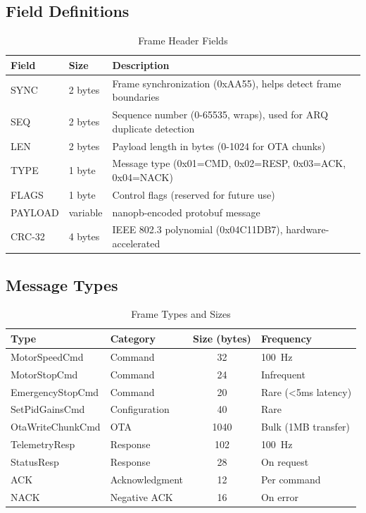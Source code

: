 \documentclass[12pt,letterpaper]{article}
\begin{document}
\subsection{Field Definitions}

\begin{table}[H]
\centering
\caption{Frame Header Fields}
\begin{tabular}{llp{7cm}}
\toprule
\textbf{Field} & \textbf{Size} & \textbf{Description} \\
\midrule
SYNC & 2 bytes & Frame synchronization (0xAA55), helps detect frame boundaries \\
SEQ & 2 bytes & Sequence number (0-65535, wraps), used for ARQ duplicate detection \\
LEN & 2 bytes & Payload length in bytes (0-1024 for OTA chunks) \\
TYPE & 1 byte & Message type (0x01=CMD, 0x02=RESP, 0x03=ACK, 0x04=NACK) \\
FLAGS & 1 byte & Control flags (reserved for future use) \\
PAYLOAD & variable & nanopb-encoded protobuf message \\
CRC-32 & 4 bytes & IEEE 802.3 polynomial (0x04C11DB7), hardware-accelerated \\
\bottomrule
\end{tabular}
\end{table}

\subsection{Message Types}

\begin{table}[H]
\centering
\caption{Frame Types and Sizes}
\begin{tabular}{llcl}
\toprule
\textbf{Type} & \textbf{Category} & \textbf{Size (bytes)} & \textbf{Frequency} \\
\midrule
MotorSpeedCmd & Command & 32 & 100~Hz \\
MotorStopCmd & Command & 24 & Infrequent \\
EmergencyStopCmd & Command & 20 & Rare (<5ms latency) \\
SetPidGainsCmd & Configuration & 40 & Rare \\
OtaWriteChunkCmd & OTA & 1040 & Bulk (1MB transfer) \\
TelemetryResp & Response & 102 & 100~Hz \\
StatusResp & Response & 28 & On request \\
ACK & Acknowledgment & 12 & Per command \\
NACK & Negative ACK & 16 & On error \\
\bottomrule
\end{tabular}
\end{table}
\end{document}
